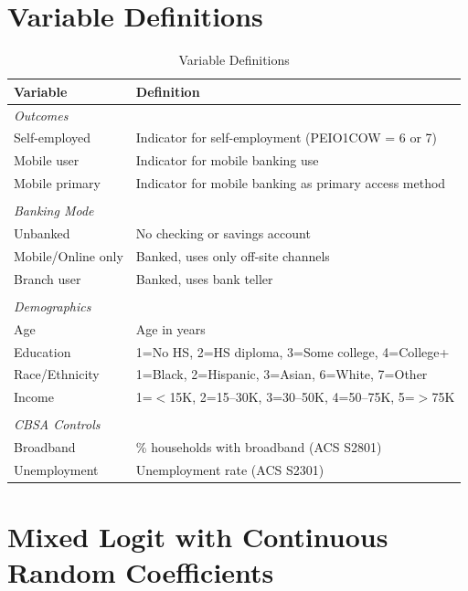 \documentclass[12pt]{article}
\begin{document}
\section{Variable Definitions}

\begin{table}[H]
\centering
\caption{Variable Definitions}
\label{tab:variables}
\begin{tabular}{lp{10cm}}
\toprule
Variable & Definition \\
\midrule
\textit{Outcomes} & \\
Self-employed & Indicator for self-employment (PEIO1COW = 6 or 7) \\
Mobile user & Indicator for mobile banking use \\
Mobile primary & Indicator for mobile banking as primary access method \\
\\
\textit{Banking Mode} & \\
Unbanked & No checking or savings account \\
Mobile/Online only & Banked, uses only off-site channels \\
Branch user & Banked, uses bank teller \\
\\
\textit{Demographics} & \\
Age & Age in years \\
Education & 1=No HS, 2=HS diploma, 3=Some college, 4=College+ \\
Race/Ethnicity & 1=Black, 2=Hispanic, 3=Asian, 6=White, 7=Other \\
Income & 1=$<$15K, 2=15--30K, 3=30--50K, 4=50--75K, 5=$>$75K \\
\\
\textit{CBSA Controls} & \\
Broadband & \% households with broadband (ACS S2801) \\
Unemployment & Unemployment rate (ACS S2301) \\
\bottomrule
\end{tabular}
\end{table}

\section{Mixed Logit with Continuous Random Coefficients}
\label{app:mixed_logit}
\end{document}
